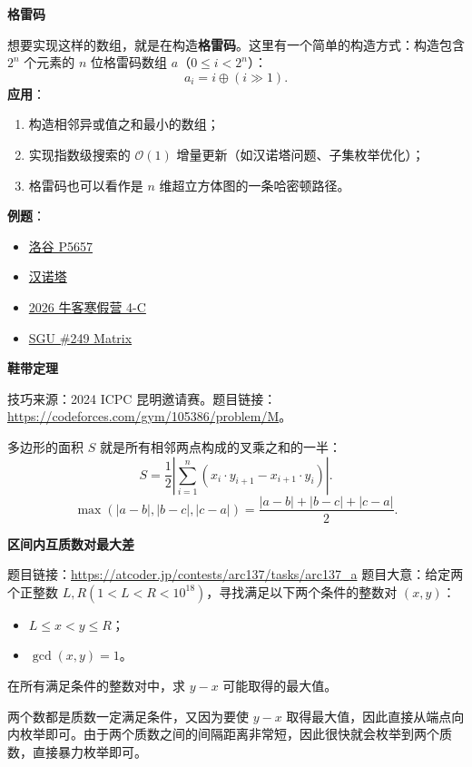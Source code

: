\par\medskip\noindent\textbf{格雷码}\par\smallskip
想要实现这样的数组，就是在构造\textbf{格雷码}。这里有一个简单的构造方式：构造包含 $2^n$ 个元素的 $n$ 位格雷码数组 $a$（$0\le i<2^n$）：
\[
a_i=i\oplus(i\gg 1).
\]
\textbf{应用}：
\begin{enumerate}
  \item 构造相邻异或值之和最小的数组；
  \item 实现指数级搜索的 $\mathcal{O}(1)$ 增量更新（如汉诺塔问题、子集枚举优化）；
  \item 格雷码也可以看作是 $n$ 维超立方体图的一条哈密顿路径。
\end{enumerate}
\textbf{例题}：
\begin{itemize}
  \item \href{https://www.luogu.com.cn/problem/P5657}{洛谷 P5657}
  \item \href{https://ac.nowcoder.com/acm/problem/306749}{汉诺塔}
  \item \href{https://ac.nowcoder.com/acm/contest/120564/C}{2026 牛客寒假营 4-C}
  \item \href{https://codeforces.com/problemsets/acmsguru/problem/99999/249}{SGU \#249 Matrix}
\end{itemize}

\par\medskip\noindent\textbf{鞋带定理}\par\smallskip
技巧来源：2024 ICPC 昆明邀请赛。题目链接：\url{https://codeforces.com/gym/105386/problem/M}。

多边形的面积 $S$ 就是所有相邻两点构成的叉乘之和的一半：
\[
S=\frac{1}{2}\left|\sum_{i=1}^{n}(x_i\cdot y_{i+1}-x_{i+1}\cdot y_i)\right|.
\]
\[
\max(|a-b|,|b-c|,|c-a|)=\frac{|a-b|+|b-c|+|c-a|}{2}.
\]

\par\medskip\noindent\textbf{区间内互质数对最大差}\par\smallskip
题目链接：\url{https://atcoder.jp/contests/arc137/tasks/arc137_a}
题目大意：给定两个正整数 $L,R(1<L<R<10^{18})$，寻找满足以下两个条件的整数对 $(x,y)$：
\begin{itemize}
  \item $L\le x<y\le R$；
  \item $\gcd(x,y)=1$。
\end{itemize}
在所有满足条件的整数对中，求 $y-x$ 可能取得的最大值。

两个数都是质数一定满足条件，又因为要使 $y-x$ 取得最大值，因此直接从端点向内枚举即可。由于两个质数之间的间隔距离非常短，因此很快就会枚举到两个质数，直接暴力枚举即可。

